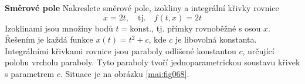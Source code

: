\begin{mdframed}[style=mdexam]
  \begin{example}\label{mai:exam098}
    \textbf{Směrové pole}\newline
      Nakreslete směrové pole, izokliny a integrální křivky rovnice
      \begin{equation*}
        \dot{x} = 2t, \quad\text{tj.}\quad f(t,x) = 2t
      \end{equation*}
      Izoklinami jsou množiny bodů \(t=\text{konst.}\), tj. přímky rovnoběžné s osou \(x\). Řešením
      je každá funkce \(x(t) = t^2 + c\), kde \(c\) je libovolná konstanta. Integrálními křivkami
      rovnice jsou paraboly odlišené konstantou \(c\), určující polohu vrcholu paraboly. Tyto
      paraboly tvoří jednoparametrickou soustavu křivek s parametrem \(c\). Situace je na obrázku
      \ref{mai:fig068}.
      
      {\centering
      \captionsetup{type=figure}
      \label{mai:fig068}
      \par}
  \end{example}
\end{mdframed}